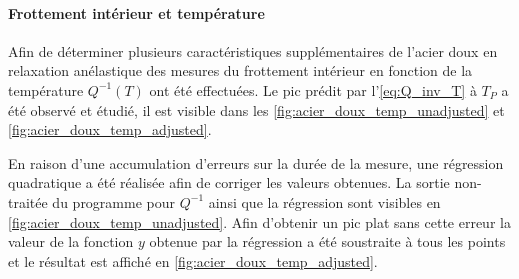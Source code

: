 \paragraph{Frottement intérieur et température} Afin de déterminer plusieurs caractéristiques supplémentaires de l'acier doux en relaxation anélastique des mesures du frottement intérieur en fonction de la température $Q^{-1}(T)$ ont été effectuées. Le pic prédit par l'\autoref{eq:Q_inv_T} à $T_P$ a été observé et étudié, il est visible dans les \autoref{fig:acier_doux_temp_unadjusted} et \autoref{fig:acier_doux_temp_adjusted}.

En raison d'une accumulation d'erreurs sur la durée de la mesure, une régression quadratique a été réalisée afin de corriger les valeurs obtenues. La sortie non-traitée du programme pour $Q^{-1}$ ainsi que la régression sont visibles en \autoref{fig:acier_doux_temp_unadjusted}. Afin d'obtenir un pic plat sans cette erreur la valeur de la fonction $y$ obtenue par la régression a été soustraite à tous les points et le résultat est affiché en \autoref{fig:acier_doux_temp_adjusted}.

